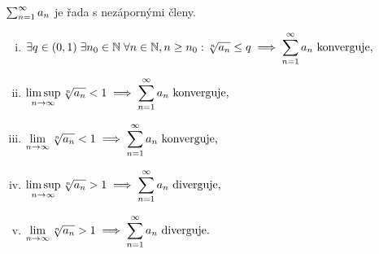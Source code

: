 \begin{theorem}
    \Necht $\sum_{n=1}^\infty a_n$ je řada s nezápornými členy. 
    \begin{enumerate}[(i)]
        \item $\displaystyle \exists q \in (0,1) \; \exists n_0 \in \mathbb{N} \; 
            \forall n \in \mathbb{N}, n\geq n_0: \sqrt[n]{a_n} \leq q 
            \implies \sum_{n=1}^\infty a_n \text{ konverguje,}$
        \item $\displaystyle \limsup_{n\to\infty} \sqrt[n]{a_n} < 1 
            \implies \sum_{n=1}^\infty a_n \text{ konverguje,}$
        \item $\displaystyle \lim_{n\to\infty} \sqrt[n]{a_n} < 1 
            \implies \sum_{n=1}^\infty a_n \text{ konverguje,}$
        \item $\displaystyle \limsup_{n\to\infty} \sqrt[n]{a_n} > 1 
            \implies \sum_{n=1}^\infty a_n \text{ diverguje,}$
        \item $\displaystyle \lim_{n\to\infty} \sqrt[n]{a_n} > 1 
            \implies \sum_{n=1}^\infty a_n \text{ diverguje.}$


    \end{enumerate}
\end{theorem}

